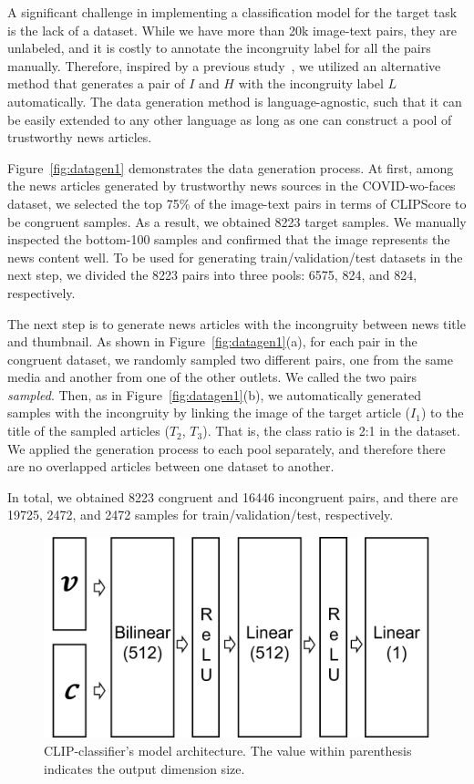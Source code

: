 \documentclass[11pt]{article}
\begin{document}
A significant challenge in implementing a classification model for the target task is the lack of a dataset. While we have more than 20k image-text pairs, they are unlabeled, and it is costly to annotate the incongruity label for all the pairs manually. Therefore, inspired by a previous study~\cite{yoon2019detecting}, we utilized an alternative method that generates a pair of $I$ and $H$ with the incongruity label $L$ automatically. The data generation method is language-agnostic, such that it can be easily extended to any other language as long as one can construct a pool of trustworthy news articles.

Figure~\ref{fig:datagen1} demonstrates the data generation process. At first, among the news articles generated by trustworthy news sources in the COVID-wo-faces dataset, we selected the top 75\% of the image-text pairs in terms of CLIPScore to be congruent samples. As a result, we obtained 8223 target samples. We manually inspected the bottom-100 samples and confirmed that the image represents the news content well. To be used for generating train/validation/test datasets in the next step, we divided the 8223 pairs into three pools: 6575, 824, and 824, respectively.

The next step is to generate news articles with the incongruity between news title and thumbnail. As shown in Figure~\ref{fig:datagen1}(a), for each pair in the congruent dataset, we randomly sampled two different pairs, one from the same media and another from one of the other outlets. We called the two pairs \textit{sampled}. Then, as in Figure~\ref{fig:datagen1}(b), we automatically generated samples with the incongruity by linking the image of the target article ($I_1$) to the title of the sampled articles ($T_2$, $T_3$). That is, the class ratio is 2:1 in the dataset. We applied the generation process to each pool separately, and therefore there are no overlapped articles between one dataset to another.

In total, we obtained 8223 congruent and 16446 incongruent pairs, and there are 19725, 2472, and 2472 samples for train/validation/test, respectively.  

\begin{figure}[t]
    \centering
    \includegraphics[width=\linewidth]{fig/model_method_arch_1.png}
    \caption{CLIP-classifier’s model architecture. The value within parenthesis indicates the output dimension size.}
    \label{fig:CLIP-classifier}
\end{figure}
\end{document}
